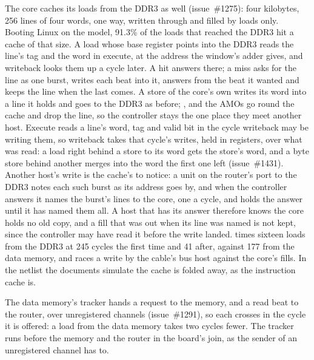 \documentclass[journal,onecolumn,9pt]{IEEEtran}
\begin{document}
The core caches its loads from the DDR3 as well (issue~\#1275): four
kilobytes, 256 lines of four words, one way, written through and
filled by loads only. Booting Linux on the model, 91.3\% of the loads
that reached the DDR3 hit a cache of that size. A load whose base
register points into the DDR3 reads the line's tag and the word in
execute, at the address the window's adder gives, and writeback looks
them up a cycle later. A hit answers there; a miss asks for the line as
one burst, writes each beat into it, answers from the beat it wanted
and keeps the line when the last comes. A store of the core's own
writes its word into a line it holds and goes to the DDR3 as before;
,  and the AMOs go round the cache and drop the
line, so the controller stays the one place they meet another host.
Execute reads a line's word, tag and valid bit in the cycle writeback
may be writing them, so writeback takes that cycle's writes, held in
registers, over what was read: a load right behind a store to its word
gets the store's word, and a byte store behind another merges into
the word the first one left (issue~\#1431).
Another host's write is the cache's to notice: a unit on the router's
port to the DDR3 notes each such burst as its address goes by, and
when the controller answers it names the burst's lines to the core,
one a cycle, and holds the answer until it has named them all. A host
that has its answer therefore knows the core holds no old copy, and a
fill that was out when its line was named is not kept, since the
controller may have read it before the write landed.
 times sixteen loads from the DDR3 at
245 cycles the first time and 41 after, against 177 from the data
memory, and races a write by the cable's bus host against the core's
fills.
In the netlist the documents simulate the cache is folded away, as
the instruction cache is.

The data memory's tracker hands a request to the memory, and a read
beat to the router, over unregistered channels (issue~\#1291), so each
crosses in the cycle it is offered: a load from the data memory takes
two cycles fewer. The tracker runs before the memory and the router in
the board's join, as the sender of an unregistered channel has to.

\begin{table}[htbp]
\caption{The board's address map, lowest first, as the router decodes
it.}
\label{tab:v-map}
\end{table}
\end{document}
